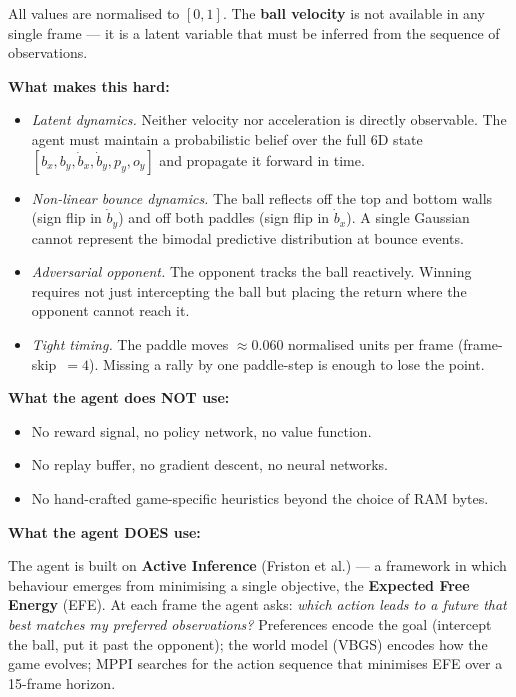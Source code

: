 \documentclass[12pt, a4paper]{article}
\newcommand{\1}{\mathbf{1}}
\begin{document}
All values are normalised to $[0,1]$.  The \textbf{ball velocity} is not available
in any single frame --- it is a latent variable that must be inferred from the
sequence of observations.

\textbf{What makes this hard:}
\begin{itemize}
  \item \textit{Latent dynamics.}  Neither velocity nor acceleration is directly
    observable.  The agent must maintain a probabilistic belief over the full 6D
    state $[b_x, b_y, \dot b_x, \dot b_y, p_y, o_y]$ and propagate it forward in
    time.
  \item \textit{Non-linear bounce dynamics.}  The ball reflects off the top and
    bottom walls (sign flip in $\dot b_y$) and off both paddles (sign flip in
    $\dot b_x$).  A single Gaussian cannot represent the bimodal predictive
    distribution at bounce events.
  \item \textit{Adversarial opponent.}  The opponent tracks the ball reactively.
    Winning requires not just intercepting the ball but placing the return where
    the opponent cannot reach it.
  \item \textit{Tight timing.}  The paddle moves $\approx 0.060$ normalised units
    per frame (frame-skip~$=4$).  Missing a rally by one paddle-step is enough to
    lose the point.
\end{itemize}

\textbf{What the agent does NOT use:}
\begin{itemize}
  \item No reward signal, no policy network, no value function.
  \item No replay buffer, no gradient descent, no neural networks.
  \item No hand-crafted game-specific heuristics beyond the choice of RAM bytes.
\end{itemize}

\textbf{What the agent DOES use:}

The agent is built on \textbf{Active Inference} (Friston et al.) --- a framework
in which behaviour emerges from minimising a single objective, the
\textbf{Expected Free Energy} (EFE).  At each frame the agent asks:
\textit{which action leads to a future that best matches my preferred
observations?}  Preferences encode the goal (intercept the ball, put it past the
opponent); the world model (VBGS) encodes how the game evolves; MPPI searches for
the action sequence that minimises EFE over a 15-frame horizon.
\end{document}
